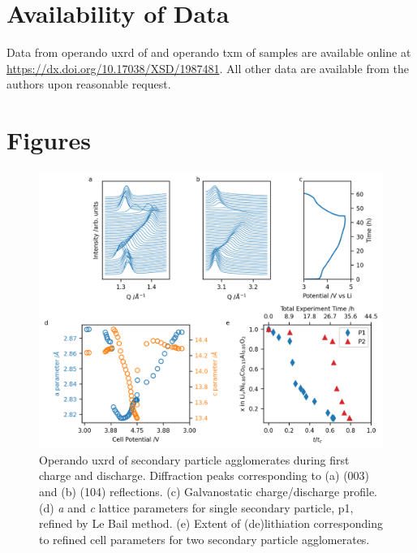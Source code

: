 \documentclass{article}
\begin{document}
\section*{Availability of Data}

Data from operando \gls{uxrd} of \nca{} and operando \gls{txm} of
\nmc{} samples are available online at
\url{https://dx.doi.org/10.17038/XSD/1987481}. All other data are
available from the authors upon reasonable request.


\newpage
\section*{Figures}

\begin{figure}[!h]
  \includegraphics[width=\textwidth]{figures/NCA_xrd.png}
  \caption{Operando \gls{uxrd} of \nca{} secondary particle
    agglomerates during first charge and discharge. Diffraction peaks
    corresponding to (a) (003) and (b) (104) reflections. (c)
    Galvanostatic charge/discharge profile. (d) \textit{a} and
    \textit{c} lattice parameters for single secondary particle,
    \gls{p1}, refined by Le Bail method. (e) Extent of (de)lithiation
    corresponding to refined cell parameters\cite{robert2015} for two
    secondary particle agglomerates.}
  \label{fig:uxrd}
\end{figure}
\end{document}
